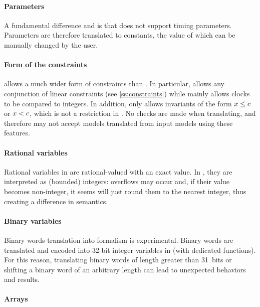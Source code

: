 \paragraph{Parameters}
A fundamental difference \imitator{} and \uppaal{} is that \uppaal{} does not support timing parameters.
Parameters are therefore translated to constants, the value of which can be manually changed by the user.

\paragraph{Form of the constraints}
\imitator{} allows a much wider form of constraints than \uppaal{}.
In particular, \imitator{} allows any conjunction of linear constraints (see \cref{ss:constraints}) while \uppaal{} mainly allows clocks to be compared to integers.
In addition, \uppaal{} only allows invariants of the form $x \leq c$ or $x < c$, which is not a restriction in \imitator{}.
No checks are made when translating, and therefore \uppaal{} may not accept models translated from \imitator{} input models using these features.

\paragraph{Rational variables}
Rational variables in \imitator{} are rational-valued with an exact value.
In \uppaal{}, they are interpreted as (bounded) integers: overflows may occur and, if their value becomes non-integer, it seems \uppaal{} will just round them to the nearest integer, thus creating a difference in semantics.

\paragraph{Binary variables}

\begin{becareful}
Binary words translation into \uppaal{} formalism is experimental. Binary words are translated and encoded into 32-bit integer variables in \uppaal{} (with dedicated functions).
For this reason, translating binary words of length greater than 31~bits or shifting a binary word of an arbitrary length can lead to unexpected behaviors and results.
\end{becareful}

\paragraph{Arrays}


